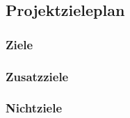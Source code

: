 \subsection{Projektzieleplan}

\subsubsection{Ziele}

\subsubsection{Zusatzziele}

\subsubsection{Nichtziele}
